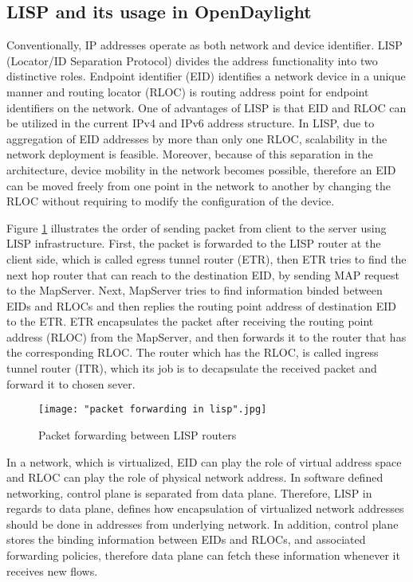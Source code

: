 \documentclass[english]{tktltiki2}
\theoremstyle{definition}
\theoremstyle{remark}
\begin{document}
\subsection{LISP and its usage in OpenDaylight}

Conventionally, IP addresses operate as both network and device identifier. LISP (Locator/ID Separation Protocol) divides the address functionality into two distinctive roles. Endpoint identifier (EID)  identifies a network device in a unique manner and routing locator (RLOC) is routing address point for endpoint identifiers on the network. One of advantages of LISP is that EID and RLOC can be utilized in the current IPv4 and IPv6 address structure. In LISP, due to aggregation of EID addresses by more than only one RLOC, scalability in the network deployment is feasible. Moreover, because of this separation in the architecture, device mobility in the network becomes possible, therefore an EID can be moved freely from one point in the network to another by changing the RLOC without requiring to modify the configuration of the device. \cite{OKH14}

Figure \ref{fig:LispPacketForwarding} illustrates the order of sending packet from client to the server using LISP infrastructure. First, the packet is forwarded to the LISP router at the client side, which is called egress tunnel router (ETR), then ETR tries to find the next hop router that can reach to the destination EID, by sending MAP request to the MapServer. Next, MapServer tries to find information binded between EIDs and RLOCs and then replies the routing point address of destination EID to the ETR. ETR encapsulates the packet after receiving the routing point address (RLOC) from the MapServer, and then forwards it to the router that has the corresponding RLOC. The router which has the RLOC, is called ingress tunnel router (ITR), which its job is to decapsulate the received packet and forward it to chosen sever. 


\begin{figure}[h!t]
\centering
{}
\texttt{[image: "packet forwarding in lisp".jpg]}
\caption{Packet forwarding between LISP routers \cite{OKH14}}
\label{fig:LispPacketForwarding}
\end{figure}

In a network, which is virtualized, EID can play the role of virtual address space and RLOC can play the role of physical network address. In software defined networking, control plane is separated from data plane. Therefore, LISP in regards to data plane, defines how encapsulation of virtualized network addresses should be done in addresses from underlying network. In addition, control plane stores the binding information between EIDs and RLOCs, and associated forwarding policies, therefore data plane can fetch these information whenever it receives new flows. \cite{ODLLISP}  
\end{document}
